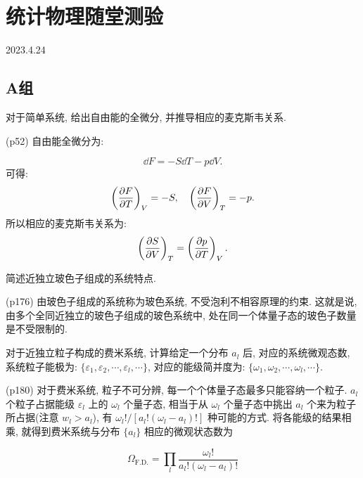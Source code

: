 \section{统计物理随堂测验}
2023.4.24
\subsection{A组}
\begin{questions}
  \question 对于简单系统, 给出自由能的全微分, 并推导相应的麦克斯韦关系.
  \begin{solution}
    (p52) 自由能全微分为:

    \begin{equation}
      \label{eq:1}
      \dd F = -S\dd T - p \dd V.
    \end{equation}
    可得:
    \begin{equation}
      \label{eq:2}
      \left( \pdv{F}{T} \right)_V = -S \qc \left( \pdv{F}{V} \right)_T = -p.
    \end{equation}
    所以相应的麦克斯韦关系为:
    \begin{equation}
      \label{eq:3}
      \left( \pdv{S}{V} \right)_T = \left( \pdv{p}{T} \right)_V.
    \end{equation}
  \end{solution}
  \question 简述近独立玻色子组成的系统特点.
  \begin{solution}
    (p176) 由玻色子组成的系统称为玻色系统, 不受泡利不相容原理的约束. 这就是说, 由多个全同近独立的玻色子组成的玻色系统中, 处在同一个体量子态的玻色子数量是不受限制的.
  \end{solution}
  \question 对于近独立粒子构成的费米系统, 计算给定一个分布 $a_l$ 后, 对应的系统微观态数, 系统粒子能极为: $\{\varepsilon_1, \varepsilon_2, \cdots, \varepsilon_l, \cdots\}$, 对应的能级简并度为: $ \{ \omega_1, \omega_2, \cdots, \omega_l, \cdots  \}$.
  \begin{solution}
    (p180)    对于费米系统, 粒子不可分辨, 每一个个体量子态最多只能容纳一个粒子. $ a_l $ 个粒子占据能级 $ \varepsilon_l$ 上的 $ \omega_l  $ 个量子态, 相当于从 $\omega_l$ 个量子态中挑出 $a_l$ 个来为粒子所占据(注意 $w_l > a_l$), 有 $ \omega_l! / [a_l!(\omega_l-a_l)!]$ 种可能的方式. 将各能级的结果相乘, 就得到费米系统与分布 $\{a_l\}$ 相应的微观状态数为

    \begin{equation}
      \label{eq:4}
      \Omega_{\mathrm{F.D.}} = \prod_l \frac{\omega_l!}{a_l! (\omega_l-a_l)!}
    \end{equation}
  \end{solution}


\end{questions}
